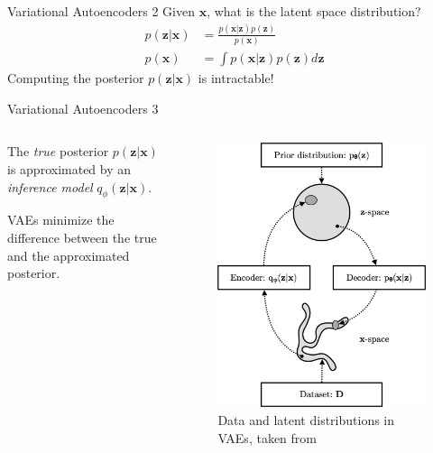 \documentclass{beamer}
\begin{document}
\begin{frame}{Variational Autoencoders 2}
Given $\bm{x}$, what is the latent space distribution?
\begin{align*}
p(\bm{z}|\bm{x}) &= \frac{p(\bm{x}|\bm{z})p(\bm{z})}{p(\bm{x})} \\
p(\bm{x}) &= \int p(\bm{x}|\bm{z})p(\bm{z})d\bm{z}
\end{align*}
Computing the posterior $p(\bm{z}|\bm{x})$ is intractable!
\end{frame}
\begin{frame}{Variational Autoencoders 3}
\begin{columns}
\begin{column}{0.48\textwidth}
The \textit{true} posterior $p(\bm{z}|\bm{x})$ is approximated by an \textit{inference model} $q_\phi(\bm{z}|\bm{x})$.

VAEs minimize the difference between the true and the approximated posterior.
\end{column}
\begin{column}{0.48\textwidth}
\begin{figure}
\centering
\includegraphics[width=.9\textwidth]{pres_imgs/vae_interplay.png}
\caption{Data and latent distributions in VAEs, taken from~\cite{kingma2019introduction}}
\label{fig:vae_interplay}
\end{figure}
\end{column}
\end{columns}
\end{frame}
\end{document}
